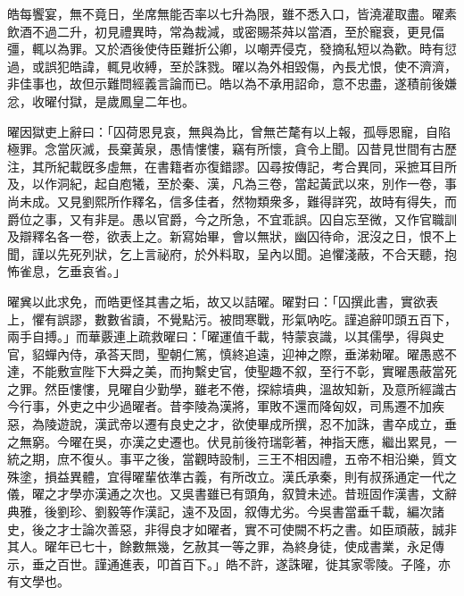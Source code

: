 \begin{pinyinscope}
皓每饗宴，無不竟日，坐席無能否率以七升為限，雖不悉入口，皆澆灌取盡。曜素飲酒不過二升，初見禮異時，常為裁減，或密賜茶荈以當酒，至於寵衰，更見偪彊，輒以為罪。又於酒後使侍臣難折公卿，以嘲弄侵克，發摘私短以為歡。時有愆過，或誤犯皓諱，輒見收縛，至於誅戮。曜以為外相毀傷，內長尤恨，使不濟濟，非佳事也，故但示難問經義言論而已。皓以為不承用詔命，意不忠盡，遂積前後嫌忿，收曜付獄，是歲鳳皇二年也。

曜因獄吏上辭曰：「囚荷恩見哀，無與為比，曾無芒氂有以上報，孤辱恩寵，自陷極罪。念當灰滅，長棄黃泉，愚情慺慺，竊有所懷，貪令上聞。囚昔見世間有古歷注，其所紀載旣多虛無，在書籍者亦復錯謬。囚尋按傳記，考合異同，采摭耳目所及，以作洞紀，起自庖犧，至於秦、漢，凡為三卷，當起黃武以來，別作一卷，事尚未成。又見劉熙所作釋名，信多佳者，然物類衆多，難得詳究，故時有得失，而爵位之事，又有非是。愚以官爵，今之所急，不宜乖誤。囚自忘至微，又作官職訓及辯釋名各一卷，欲表上之。新寫始畢，會以無狀，幽囚待命，泯沒之日，恨不上聞，謹以先死列狀，乞上言祕府，於外料取，呈內以聞。追懼淺蔽，不合天聽，抱怖雀息，乞垂哀省。」

曜兾以此求免，而皓更怪其書之垢，故又以詰曜。曜對曰：「囚撰此書，實欲表上，懼有誤謬，數數省讀，不覺點污。被問寒戰，形氣吶吃。謹追辭叩頭五百下，兩手自搏。」而華覈連上疏救曜曰：「曜運值千載，特蒙哀識，以其儒學，得與史官，貂蟬內侍，承荅天問，聖朝仁篤，慎終追遠，迎神之際，垂涕勑曜。曜愚惑不達，不能敷宣陛下大舜之美，而拘繫史官，使聖趣不叙，至行不彰，實曜愚蔽當死之罪。然臣慺慺，見曜自少勤學，雖老不倦，探綜墳典，溫故知新，及意所經識古今行事，外吏之中少過曜者。昔李陵為漢將，軍敗不還而降匈奴，司馬遷不加疾惡，為陵遊說，漢武帝以遷有良史之才，欲使畢成所撰，忍不加誅，書卒成立，垂之無窮。今曜在吳，亦漢之史遷也。伏見前後符瑞彰著，神指天應，繼出累見，一統之期，庶不復乆。事平之後，當觀時設制，三王不相因禮，五帝不相沿樂，質文殊塗，損益異體，宜得曜輩依準古義，有所改立。漢氏承秦，則有叔孫通定一代之儀，曜之才學亦漢通之次也。又吳書雖已有頭角，叙贊未述。昔班固作漢書，文辭典雅，後劉珍、劉毅等作漢記，遠不及固，叙傳尤劣。今吳書當垂千載，編次諸史，後之才士論次善惡，非得良才如曜者，實不可使闕不朽之書。如臣頑蔽，誠非其人。曜年已七十，餘數無幾，乞赦其一等之罪，為終身徒，使成書業，永足傳示，垂之百世。謹通進表，叩首百下。」皓不許，遂誅曜，徙其家零陵。子隆，亦有文學也。


\end{pinyinscope}